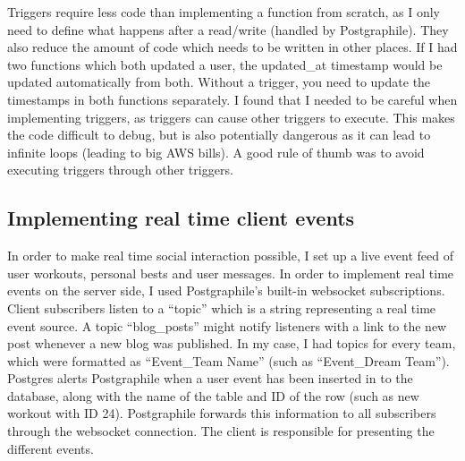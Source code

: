 \documentclass{l4proj}
\begin{document}
Triggers require less code than implementing a function from scratch, as I only need to define what happens after a read/write (handled by Postgraphile). They also reduce the amount of code which needs to be written in other places. If I had two functions which both updated a user, the updated\_at timestamp would be updated automatically from both. Without a trigger, you need to update the timestamps in both functions separately. I found that I needed to be careful when implementing triggers, as triggers can cause other triggers to execute. This makes the code difficult to debug, but is also potentially dangerous as it can lead to infinite loops (leading to big AWS bills). A good rule of thumb was to avoid executing triggers through other triggers.

\subsection{Implementing real time client events}
In order to make real time social interaction possible, I set up a live event feed of user workouts, personal bests and user messages. In order to implement real time events on the server side, I used Postgraphile's built-in websocket subscriptions. Client subscribers listen to a ``topic'' which is a string representing a real time event source. A topic ``blog\_posts'' might notify listeners with a link to the new post whenever a new blog was published. In my case, I had topics for every team, which were formatted as ``Event\_{Team Name}'' (such as ``Event\_Dream Team''). Postgres alerts Postgraphile when a user event has been inserted in to the database, along with the name of the table and ID of the row (such as new workout with ID 24). Postgraphile forwards this information to all subscribers through the websocket connection. The client is responsible for presenting the different events. 
\end{document}
